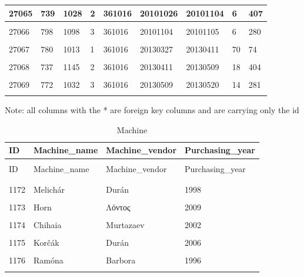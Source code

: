 \documentclass[letterpaper,12pt]{article}
\begin{document}
\begin{longtable}{p{1cm}p{1.5cm}p{1.5cm}p{1cm}p{1.5cm}p{1.8cm}p{1.6cm}p{1.3cm}p{2.2cm}}
        27065 & 739 & 1028 & 2 & \color{red} 361016 & 20101026 & 20101104 & 6 & 407 \\
        \hline \\
        27066 & 798 & 1098 & 3 & \color{red} 361016 & 20101104 & 20101105 & 6 & 280 \\
        \hline \\
        27067 & 780 & 1013 & 1 & \color{red} 361016 & 20130327 & 20130411 & 70 & 74 \\
        \hline \\
        27068 & 737 & 1145 & 2 & \color{red} 361016 & 20130411 & 20130509 & 18 & 404 \\
        \hline \\
        27069 & 772 & 1032 & 3 & \color{red} 361016 & 20130509 & 20130520 & 14 & 281 \\
        \hline \\
\end{longtable} 
\endgroup

Note: all columns with the * are foreign key columns and are carrying only the id

\begingroup
\renewcommand\arraystretch{0.5}
\begin{longtable}{p{1cm}p{3cm}p{3.2cm}p{3.1cm}}
        \caption{Machine} \\
        ID & Machine\_name & Machine\_vendor & Purchasing\_year \\
        \endfirsthead \\
        ID & Machine\_name & Machine\_vendor & Purchasing\_year \\
        \endhead \\
        \hline \\
        1172 & Melichár & Durán & 1998 \\
        \hline \\
        1173 & Horn & Λόντος & 2009 \\
        \hline \\
        1174 & Chihaia & Murtazaev & 2002 \\
        \hline \\
        1175 & Korčák & Durán & 2006 \\
        \hline \\
        \color{red} 1176 & \color{red} Ramóna & Barbora & 1996 \\
        \hline \\
\end{longtable} 
\endgroup
\end{document}
